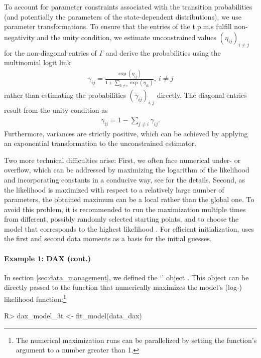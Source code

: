 \documentclass[article]{jss}
\newcommand{\class}[1]{`\code{#1}'}
\newcommand{\fct}[1]{\code{#1()}}
\begin{document}
To account for parameter constraints associated with the transition probabilities (and potentially the parameters of the state-dependent distributions), we use parameter transformations. To ensure that the entries of the t.p.m.s fulfill non-negativity and the unity condition, we estimate unconstrained values $(\eta_{ij})_{i\neq j}$ for the non-diagonal entries of $\Gamma$ and derive the probabilities using the multinomial logit link
\begin{align*}
\gamma_{ij}=\frac{\exp(\eta_{ij})}{1+\sum_{k\neq i}\exp(\eta_{ik})},~i\neq j
\end{align*}
rather than estimating the probabilities $(\gamma_{ij})_{i,j}$ directly. The diagonal entries result from the unity condition as
\begin{align*}
\gamma_{ii}=1-\sum_{j\neq i}\gamma_{ij}.
\end{align*}
Furthermore, variances are strictly positive, which can be achieved by applying an exponential transformation to the unconstrained estimator.

Two more technical difficulties arise: First, we often face numerical under- or overflow, which can be addressed by maximizing the logarithm of the likelihood and incorporating constants in a conducive way, see \cite{oel21} for the details. Second, as the likelihood is maximized with respect to a relatively large number of parameters, the obtained maximum can be a local rather than the global one. To avoid this problem, it is recommended to run the maximization multiple times from different, possibly randomly selected starting points, and to choose the model that corresponds to the highest likelihood \citep{zuc16}. For efficient initialization,  uses the first and second data moments as a basis for the initial guesses.

\paragraph{Example 1: DAX (cont.)} In section \ref{sec:data_management}, we defined the \class{fHMM\_data} object . This object can be directly passed to the \fct{fit\_model} function that numerically maximizes the model's (log-) likelihood function:\footnote{The numerical maximization runs can be parallelized by setting the function's  argument to a number greater than 1.}

%
\begin{Schunk}
\begin{Sinput}
R> dax_model_3t <- fit_model(data_dax)
\end{Sinput}
\end{Schunk}
%
\end{document}
